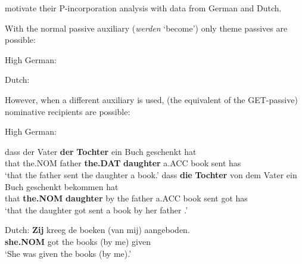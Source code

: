 \documentclass[11pt]{article}
\begin{document}
\cite{Alexiadou.2014} motivate their P-incorporation analysis with data from German and Dutch.

With the normal passive auxiliary (\textit{werden} `become') only theme passives are possible:

\begin{exe}
	\ex High German:\label{ex:hg-normal-pass}
\begin{xlist}
\end{xlist}
\ex Dutch:\label{ex:dutch-normal-pass}
\begin{xlist}
\end{xlist}
\end{exe}

However, when a different auxiliary is used, (the equivalent of the GET-passive) nominative recipients are possible:

\begin{exe}
	\ex High German:\label{ex:hg-get-pass}
\begin{xlist}
	\ex \gll dass der Vater \textbf{der} \textbf{Tochter} ein Buch geschenkt hat\\
	that the.NOM father \textbf{the.DAT} \textbf{daughter} a.ACC book sent has\\
	\trans `that the father sent the daughter a book.'
	\ex \gll dass \textbf{die} \textbf{Tochter} von dem Vater ein Buch geschenkt bekommen hat\\
	that \textbf{the.NOM} \textbf{daughter} by the father a.ACC book sent got has\\
	\trans `that the daughter got sent a book by her father \cite[183]{Draye.1996}.'
\end{xlist}
\ex Dutch:\label{ex:dut-get-pass}
\gll \textbf{Zij} kreeg de boeken (van mij) aangeboden.\\
\textbf{she.NOM} got the books (by me) given\\
\trans `She was given the books (by me).' \citep[ex. 7]{Broekhuis.1994}
\end{exe}
\end{document}
